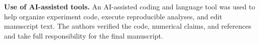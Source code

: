\documentclass[iicol,pdflatex,sn-mathphys-num]{sn-jnl}
\begin{document}
\textbf{Use of AI-assisted tools.} An AI-assisted coding and language tool was used to help organize experiment code, execute reproducible analyses, and edit manuscript text. The authors verified the code, numerical claims, and references and take full responsibility for the final manuscript.


\end{document}
